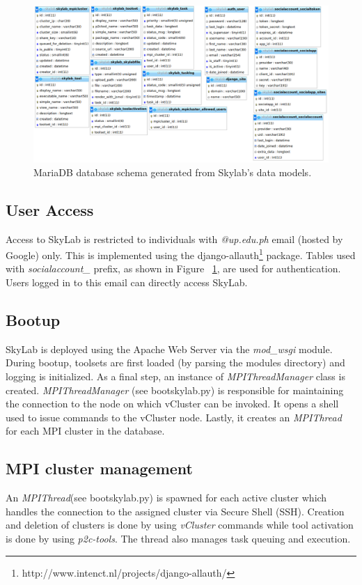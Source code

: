 	\begin{figure}[ht]
      \centering
      \includegraphics[scale=1.5]{./images/db_schema.png}
      \caption{\label{fig:dbschema}MariaDB database schema generated from Skylab's data models.}
    \end{figure}

\subsection{User Access}
Access to SkyLab is restricted to individuals with \textit{@up.edu.ph} email (hosted by Google) only. This is implemented  using the django-allauth\footnote{http://www.intenct.nl/projects/django-allauth/} package. Tables used with \textit{socialaccount\_} prefix, as shown in Figure ~\ref{fig:dbschema}, are used for authentication. Users logged in to this email can directly access SkyLab.

\subsection{Bootup}
SkyLab is deployed using the Apache Web Server via the \textit{mod\_wsgi} module. During bootup, toolsets are first loaded (by parsing the modules directory) and logging is initialized. As a final step, an instance of \textit{MPIThreadManager} class is created. \textit{MPIThreadManager} (see bootskylab.py) is responsible for maintaining the connection to the node on which vCluster can be invoked. It opens a shell used to issue commands to the vCluster node. Lastly, it creates an \textit{MPIThread} for each MPI cluster in the database. 

\subsection{MPI cluster management} 
An \textit{MPIThread}(see bootskylab.py) is spawned for each active cluster which handles the connection to the assigned cluster via Secure Shell (SSH). Creation and deletion of clusters is done by using \textit{vCluster} commands while tool activation is done by using \textit{p2c-tools}. The thread also manages task queuing and execution.
		
